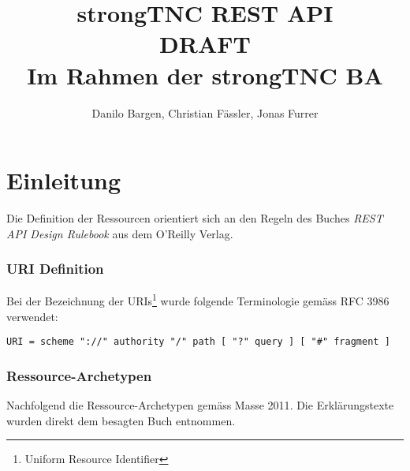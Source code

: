 \documentclass[10pt,a4paper]{scrartcl}
\author{Danilo Bargen, Christian Fässler, Jonas Furrer}
\title{strongTNC REST API\\DRAFT \\ \small{Im Rahmen der strongTNC BA} }
\let\textquotedbl="
\begin{document}
\begin{titlepage}
	\maketitle
	\vspace{120mm}
	\thispagestyle{empty} %
\end{titlepage}

\newpage
	\tableofcontents
\newpage

\section{Einleitung}

Die Definition der Ressourcen orientiert sich an den Regeln des Buches
\textit{REST API Design Rulebook}\cite{masse2011rest} aus dem O'Reilly Verlag.

\subsubsection*{URI Definition}

Bei der Bezeichnung der URIs\footnote{Uniform Resource Identifier} wurde folgende Terminologie gemäss RFC 3986\cite{rfc3986} verwendet:

\texttt{URI = scheme \textquotedbl ://\textquotedbl{} authority \textquotedbl /\textquotedbl{}
path [ \textquotedbl ?\textquotedbl{} query ] [ \textquotedbl \#\textquotedbl{} fragment ]}

\subsubsection*{Ressource-Archetypen}

Nachfolgend die Ressource-Archetypen gemäss Masse 2011\cite{masse2011rest}. Die Erklärungstexte wurden direkt dem besagten
Buch entnommen.
\end{document}
